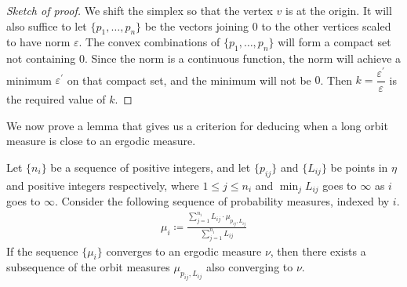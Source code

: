 \begin{proof}[Sketch of proof]
  We shift the simplex so that the vertex $v$ is at the origin.
  It will also suffice to let $\{p_1, \ldots, p_n\}$ be the vectors joining $0$ to the other vertices scaled to have norm $\varepsilon$.
  The convex combinations of $\{p_1, \ldots, p_n\}$ will form a compact set not containing $0$.
  Since the norm is a continuous function, the norm will achieve a minimum $\varepsilon^{\prime}$ on that compact set, and the minimum will not be $0$.
  Then $k = \dfrac{\varepsilon^{\prime}}{\varepsilon}$ is the required value of $k$.
\end{proof}

We now prove a lemma that gives us a criterion for deducing when a long orbit measure is close to an ergodic measure.
\begin{lemma}
  \label{lem:convexity-argument}
  Let $\{n_i\}$ be a sequence of positive integers, and let $\{p_{ij}\}$ and $\{L_{ij}\}$ be points in $\eta$ and positive integers respectively, where $1 \leq j \leq n_i$ and $\min_j L_{ij}$ goes to $\infty$ as $i$ goes to $\infty$.
  Consider the following sequence of probability measures, indexed by $i$.
  \begin{align*}
    \mu_i \coloneqq \frac{\sum_{j=1}^{n_i} L_{ij} \cdot \mu_{p_{ij}, L_{ij}}}{\sum_{j=1}^{n_i} L_{ij}}
  \end{align*}
  If the sequence $\{\mu_i\}$ converges to an ergodic measure $\nu$, then there exists a subsequence of the orbit measures $\mu_{p_{ij}, L_{ij}}$ also converging to $\nu$.
\end{lemma}
